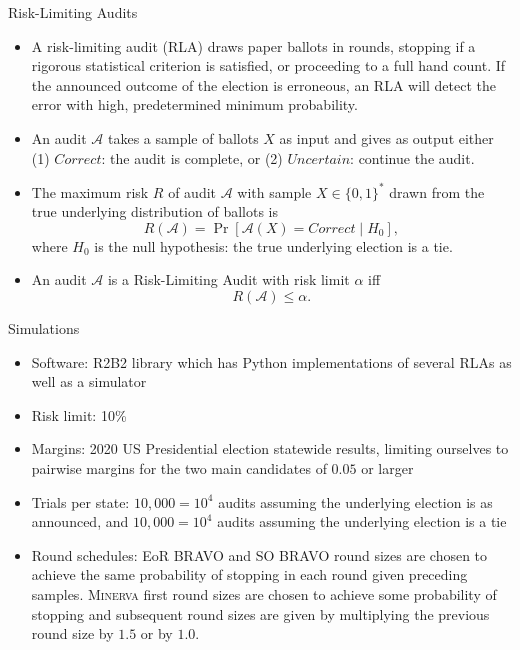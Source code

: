 \documentclass[final]{beamer}
\newcommand{\Minerva}{\textsc{Minerva}\xspace}
\newcommand{\BRAVO}{\textsc{BRAVO}\xspace}
\newlength{\colwidth}
\begin{document}
\begin{frame}[t]
\begin{columns}[t]
\begin{column}{\colwidth}
\begin{block}{Risk-Limiting Audits}

\begin{itemize}
\item
A risk-limiting audit (RLA) draws paper ballots in rounds, stopping if a rigorous statistical criterion is satisfied, or proceeding to a full hand count. If the announced outcome of the election is erroneous, an RLA will detect the error with high, predetermined minimum probability. 
\item
An audit $\mathcal{A}$ takes a sample of ballots $X$ as input and gives as output either
(1) $Correct$: the audit is complete, or (2) $Uncertain$: continue the audit.
\item
The maximum risk $R$ of audit $\mathcal{A}$ with sample $X\in \{0,1\}^*$ drawn from 
the true underlying distribution of ballots is
$$R(\mathcal{A})=\Pr[\mathcal{A}(X)=Correct \mid H_0],$$ where $H_0$ is the null
hypothesis: the true underlying election is a tie.
\item
An audit $\mathcal{A}$ is a Risk-Limiting Audit with 
risk limit $\alpha$ iff 
$$R(\mathcal{A}) \le \alpha.$$
\end{itemize}
\end{block}

\begin{block}{Simulations}

\begin{itemize}
\item 
Software: R2B2 library\cite{r2b2} which has Python implementations of several RLAs as well as a simulator
\item 
Risk limit: 10\%
\item
Margins: 2020 US Presidential election statewide results, limiting ourselves to pairwise margins
for the two main candidates of $0.05$ or larger
\item 
Trials per state: $10,000=10^4$ audits assuming the underlying election is as announced,  
and $10,000=10^4$ audits assuming the underlying election is a tie
\item 
Round schedules: EoR \BRAVO and SO \BRAVO round sizes are chosen to achieve the same
probability of stopping in each round given preceding samples. \Minerva first round sizes
are chosen to achieve some probability of stopping and subsequent round sizes are given by multiplying the previous
round size by $1.5$ or by $1.0$.
\end{itemize}
\end{block}


\end{column}
\end{columns}
\end{frame}
\end{document}
